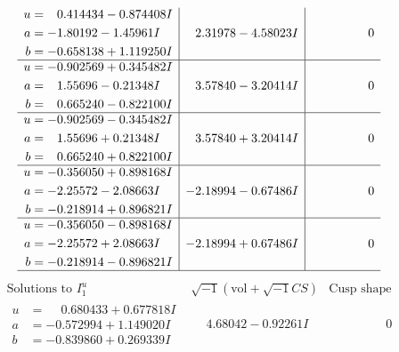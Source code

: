 \documentclass[1p]{elsarticle_modified}
\theoremstyle{definition}
\newcommand{\I}{\sqrt{-1}}
\begin{document}
$$\begin{array}{c|c|c}
\begin{aligned}
u &= \phantom{-}0.414434 - 0.874408 I \\
a &= -1.80192 - 1.45961 I \\
b &= -0.658138 + 1.119250 I\end{aligned}
 & \phantom{-}2.31978 - 4.58023 I & \phantom{-0.000000 } 0 \\ \hline\begin{aligned}
u &= -0.902569 + 0.345482 I \\
a &= \phantom{-}1.55696 - 0.21348 I \\
b &= \phantom{-}0.665240 - 0.822100 I\end{aligned}
 & \phantom{-}3.57840 - 3.20414 I & \phantom{-0.000000 } 0 \\ \hline\begin{aligned}
u &= -0.902569 - 0.345482 I \\
a &= \phantom{-}1.55696 + 0.21348 I \\
b &= \phantom{-}0.665240 + 0.822100 I\end{aligned}
 & \phantom{-}3.57840 + 3.20414 I & \phantom{-0.000000 } 0 \\ \hline\begin{aligned}
u &= -0.356050 + 0.898168 I \\
a &= -2.25572 - 2.08663 I \\
b &= -0.218914 + 0.896821 I\end{aligned}
 & -2.18994 - 0.67486 I & \phantom{-0.000000 } 0 \\ \hline\begin{aligned}
u &= -0.356050 - 0.898168 I \\
a &= -2.25572 + 2.08663 I \\
b &= -0.218914 - 0.896821 I\end{aligned}
 & -2.18994 + 0.67486 I & \phantom{-0.000000 } 0\\
 \hline 
 \end{array}$$\newpage$$\begin{array}{c|c|c}  
\text{Solutions to }I^u_{1}& \I (\text{vol} + \sqrt{-1}CS) & \text{Cusp shape}\\
 \hline 
\begin{aligned}
u &= \phantom{-}0.680433 + 0.677818 I \\
a &= -0.572994 + 1.149020 I \\
b &= -0.839860 + 0.269339 I\end{aligned}
 & \phantom{-}4.68042 - 0.92261 I & \phantom{-0.000000 } 0 \\ \hline\begin{aligned}

\end{aligned}
\end{array}$$
\end{document}
